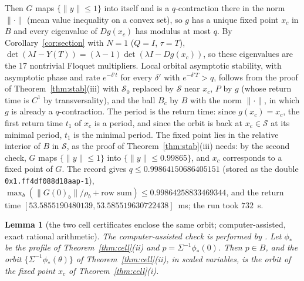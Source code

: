 \documentclass[11pt]{article}
\newtheorem{lemma}{Lemma}[section]
\theoremstyle{definition}
\begin{document}
Then $G$ maps $\{\|y\| \le 1\}$ into itself and is a $q$-contraction there in the norm $\|\cdot\|$ (mean value inequality on a convex set), so $g$ has a unique fixed point $x_c$ in $B$ and every eigenvalue of $Dg(x_c)$ has modulus at most $q$. By Corollary~\ref{cor:section} with $N = 1$ ($Q = I$, $\tau = T$), $\det(\lambda I - Y(T)) = (\lambda - 1)\det(\lambda I - Dg(x_c))$, so these eigenvalues are the 17 nontrivial Floquet multipliers. Local orbital asymptotic stability, with asymptotic phase and rate $e^{-\delta' t}$ for every $\delta'$ with $e^{-\delta' T} > q$, follows from the proof of Theorem~\ref{thm:stab}(iii) with $\mathcal S_0$ replaced by $\mathcal S$ near $x_c$, $P$ by $g$ (whose return time is $C^1$ by transversality), and the ball $B_c$ by $B$ with the norm $\|\cdot\|$, in which $g$ is already a $q$-contraction. The period is the return time: since $g(x_c) = x_c$, the first return time $t_1$ of $x_c$ is a period, and since the orbit is back at $x_c \in \mathcal S$ at its minimal period, $t_1$ is the minimal period. The fixed point lies in the relative interior of $B$ in $\mathcal S$, as the proof of Theorem~\ref{thm:stab}(iii) needs: by the second check, $G$ maps $\{\|y\| \le 1\}$ into $\{\|y\| \le 0.99865\}$, and $x_c$ corresponds to a fixed point of $G$. The record gives $q \le 0.99864150686405151$ (stored as the double \texttt{0x1.ff4df088d18aap-1}), $\max_b(\|G(0)_b\|/\rho_b + \text{row sum}) \le 0.99864258833469344$, and the return time $[53.5855190480139, 53.585519630722438]$~ms; the run took $732$~s.

\begin{lemma}[the two cell certificates enclose the same orbit; computer-assisted, exact rational arithmetic]\label{lem:link}
The computer-assisted check is performed by .
Let $\phi_*$ be the profile of Theorem~\ref{thm:cell}(ii) and $p = \Sigma^{-1}\phi_*(0)$. Then $p \in B$, and the orbit $\{\Sigma^{-1}\phi_*(\theta)\}$ of Theorem~\ref{thm:cell}(ii), in scaled variables, is the orbit of the fixed point $x_c$ of Theorem~\ref{thm:cell}(i).
\end{lemma}
\end{document}
